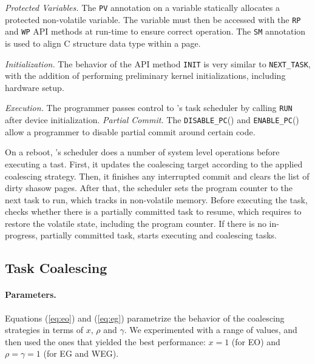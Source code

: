 \noindent\textit{Protected Variables.} The \texttt{PV} annotation on a
variable statically allocates a protected non-volatile variable. The
variable must then be accessed with the \texttt{RP} and \texttt{WP} API methods at run-time to ensure correct operation. The \texttt{SM} annotation is used to align C structure data type within a page. 

\noindent\textit{Initialization.} The behavior of the API method
\texttt{INIT} is very similar to \texttt{NEXT\_TASK}, with the
addition of performing preliminary kernel initializations, including hardware setup.

\noindent\textit{Execution.} The programmer passes control to \sys's task scheduler 
by calling \texttt{RUN} after device initialization. 
\noindent\textit{Partial Commit.} The \texttt{DISABLE\_PC}() and \texttt{ENABLE\_PC}() allow a programmer to disable partial commit around certain code.

On a reboot, \sys's scheduler does a number of system level operations before executing a tast. 
 First, it updates the coalescing target according to the applied coalescing
strategy. Then, it finishes any interrupted commit and clears the list of dirty shasow pages.
After that, the scheduler sets the program counter to the next task to run, which \sys tracks in  
non-volatile memory.  
%
Before executing the task, \sys checks whether there is a partially committed
task to resume, which requires \sys to restore the volatile state, including the program
counter.  
%
If there is no in-progress, partially committed task, \sys starts executing and
coalescing tasks. 

%
\subsection{Task Coalescing}
%
%
\paragraph{Parameters.}
Equations (\ref{eq:eo}) and (\ref{eq:eg}) parametrize the behavior of the coalescing strategies in terms of $x$, $\rho$ and $\gamma$.
We experimented with a range of values, and then used the ones that yielded the best performance: $x = 1$ (for EO) and $\rho = \gamma = 1$ (for EG and WEG).

